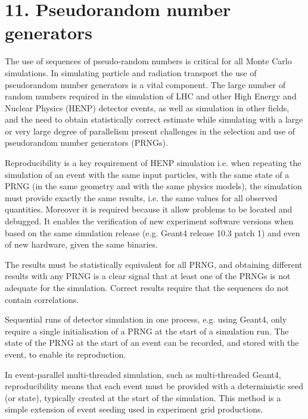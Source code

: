 \documentclass[12pt,a4paper]{article}
\begin{document}
\hypertarget{pseudorandom-number-generators}{%
\section{\texorpdfstring{\textbf{11. Pseudorandom number
generators}}{11. Pseudorandom number generators}}\label{pseudorandom-number-generators}}

The use of sequences of pseudo-random numbers is critical for all Monte
Carlo simulations. In simulating particle and radiation transport the
use of pseudorandom number generators is a vital component. The large
number of random numbers required in the simulation of LHC and other
High Energy and Nuclear Physics (HENP) detector events, as well as
simulation in other fields, and the need to obtain statistically correct
estimate while simulating with a large or very large degree of
parallelism present challenges in the selection and use of pseudorandom
number generators (PRNGs).

Reproducibility is a key requirement of HENP simulation i.e. when
repeating the simulation of an event with the same input particles, with
the same state of a PRNG (in the same geometry and with the same physics
models), the simulation must provide exactly the same results, i.e. the
same values for all observed quantities. Moreover it is required because
it allow problems to be located and debugged. It enables the
verification of new experiment software versions when based on the same
simulation release (e.g. Geant4 release 10.3 patch 1) and even of new
hardware, given the same binaries.

The results must be statistically equivalent for all PRNG, and obtaining
different results with any PRNG is a clear signal that at least one of
the PRNGs is not adequate for the simulation. Correct results require
that the sequences do not contain correlations.

Sequential runs of detector simulation in one process, e.g. using
Geant4, only require a single initialisation of a PRNG at the start of a
simulation run. The state of the PRNG at the start of an event can be
recorded, and stored with the event, to enable its reproduction.

In event-parallel multi-threaded simulation, such as multi-threaded
Geant4, reproducibility means that each event must be provided with a
deterministic seed (or state), typically created at the start of the
simulation. This method is a simple extension of event seeding used in
experiment grid productions.
\end{document}
